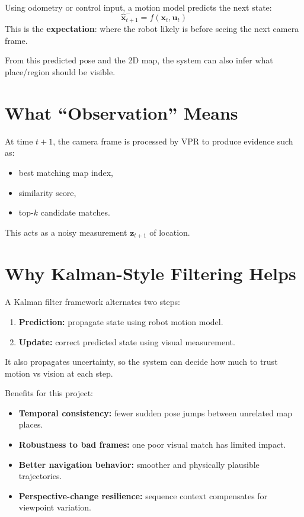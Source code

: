 \documentclass[11pt]{article}
\begin{document}
Using odometry or control input, a motion model predicts the next state:
\[
\hat{\mathbf{x}}_{t+1}^{-} = f(\mathbf{x}_t,\mathbf{u}_t)
\]
This is the \textbf{expectation}: where the robot likely is before seeing the next camera frame.

From this predicted pose and the 2D map, the system can also infer what place/region should be visible.

\section*{What ``Observation'' Means}
At time $t+1$, the camera frame is processed by VPR to produce evidence such as:
\begin{itemize}[leftmargin=*]
  \item best matching map index,
  \item similarity score,
  \item top-$k$ candidate matches.
\end{itemize}

This acts as a noisy measurement $\mathbf{z}_{t+1}$ of location.

\section*{Why Kalman-Style Filtering Helps}
A Kalman filter framework alternates two steps:
\begin{enumerate}[leftmargin=*]
  \item \textbf{Prediction:} propagate state using robot motion model.
  \item \textbf{Update:} correct predicted state using visual measurement.
\end{enumerate}

It also propagates uncertainty, so the system can decide how much to trust motion vs vision at each step.

Benefits for this project:
\begin{itemize}[leftmargin=*]
  \item \textbf{Temporal consistency:} fewer sudden pose jumps between unrelated map places.
  \item \textbf{Robustness to bad frames:} one poor visual match has limited impact.
  \item \textbf{Better navigation behavior:} smoother and physically plausible trajectories.
  \item \textbf{Perspective-change resilience:} sequence context compensates for viewpoint variation.
\end{itemize}
\end{document}
